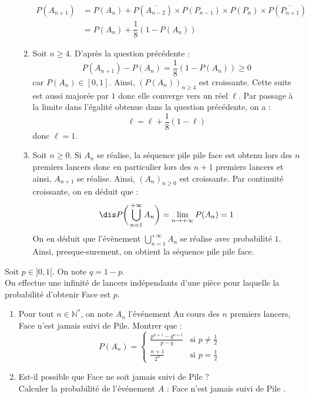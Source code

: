 \documentclass[a4paper,10pt]{report}
\begin{document}
\begin{enumerate}
\begin{enumerate}
\begin{align*}
P(A_{n+1}) & = P(A_n) +   P(\overline{A_{n-2}}) \times P( P_{n-1}) \times P(P_n) \times P(\overline{P_{n+1}}) \\
& = P(A_n) + \dfrac{1}{8} (1-P(A_n))
\end{align*}
\item Soit $n \geq 4$. D'après la question précédente :
$$ P(A_{n+1})-P(A_n)= \dfrac{1}{8} (1-P(A_n)) \geq 0$$
car $P(A_n) \in [0,1]$. Ainsi, $(P(A_n))_{n \geq 4}$ est croissante. Cette suite est aussi majorée par $1$ donc elle converge vers un réel $\ell$. Par passage à la limite dans l'égalité obtenue dans la question précédente, on a :
$$ \ell = \ell + \dfrac{1}{8}(1- \ell)$$
donc $\ell =1$.
\item Soit $n \geq 0$. Si $A_{n}$ se réalise, la séquence pile pile face est obtenu lors des $n$ premiers lancers donc en particulier lors des $n+1$ premiers lancers et ainsi, $A_{n+1}$ se réalise. Ainsi, $(A_n)_{n \geq 0}$ est croissante. Par continuité croissante, on en déduit que :
$$\dis P \bigg{(} \bigcup_{n=1}^{+  \infty} A_n \bigg{)} = \lim_{n \rightarrow + \infty} P(A_n) = 1$$
On en déduit que l'évènement $\bigcup_{n=1}^{+  \infty} A_n $ se réalise avec probabilité $1$. Ainsi, presque-surement, on obtient la séquence pile pile face.
\end{enumerate}
\end{enumerate}

\begin{Exa}
Soit $p \in ]0,1[$. On note $q=1-p$.\\
On effectue une infinité de lancers indépendants d'une pièce pour laquelle la probabilité d'obtenir Face est $p$.
\begin{enumerate}
\item Pour tout $n \in \mathbb{N}^*$, on note $A_n$ l'événement \og Au cours des $n$ premiers lancers, Face n'est jamais suivi de Pile\fg.
Montrer que :
$$P(A_n)=\begin{cases}
{\frac{p^{n+1}-q^{n+1}}{p-q}} & \text{si } p \neq \frac 1 2\\
{\frac{n+1}{2^n}} & \text{si } p=\frac 1 2
\end{cases}$$
\item Est-il possible que Face ne soit jamais suivi de Pile ?\\
Calculer la probabilité de l'événement $A$ : \og Face n'est jamais suivi de Pile \fg.
\end{enumerate}
\end{Exa}
\end{document}
